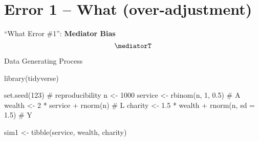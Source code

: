 \documentclass[
  ignorenonframetext,
  aspectratio=169,
  xcolor=\{dvipsnames\}]{beamer}
\newenvironment{Shaded}{\begin{snugshade}}{\end{snugshade}}
\newcommand{\AttributeTok}[1]{\textcolor[rgb]{0.40,0.45,0.13}{#1}}
\newcommand{\CommentTok}[1]{\textcolor[rgb]{0.37,0.37,0.37}{#1}}
\newcommand{\DecValTok}[1]{\textcolor[rgb]{0.68,0.00,0.00}{#1}}
\newcommand{\FloatTok}[1]{\textcolor[rgb]{0.68,0.00,0.00}{#1}}
\newcommand{\FunctionTok}[1]{\textcolor[rgb]{0.28,0.35,0.67}{#1}}
\newcommand{\NormalTok}[1]{\textcolor[rgb]{0.00,0.23,0.31}{#1}}
\newcommand{\OtherTok}[1]{\textcolor[rgb]{0.00,0.23,0.31}{#1}}
\newcommand{\SpecialCharTok}[1]{\textcolor[rgb]{0.37,0.37,0.37}{#1}}
\begin{document}
\section{Error 1 -- What
(over-adjustment)}\label{error-1-what-over-adjustment}

\begin{frame}{``What Error \#1'': \textbf{Mediator Bias}}
\label{what-error-1-mediator-bias}
\[\mediatorT\]
\end{frame}

\begin{frame}[fragile]{Data Generating Process}
\label{data-generating-process}
\begin{Shaded}
\begin{Highlighting}[]
\FunctionTok{library}\NormalTok{(tidyverse)}

\FunctionTok{set.seed}\NormalTok{(}\DecValTok{123}\NormalTok{)                           }\CommentTok{\# reproducibility}
\NormalTok{n        }\OtherTok{\textless{}{-}} \DecValTok{1000}
\NormalTok{service  }\OtherTok{\textless{}{-}} \FunctionTok{rbinom}\NormalTok{(n, }\DecValTok{1}\NormalTok{, }\FloatTok{0.5}\NormalTok{)          }\CommentTok{\# A}
\NormalTok{wealth   }\OtherTok{\textless{}{-}} \DecValTok{2} \SpecialCharTok{*}\NormalTok{ service }\SpecialCharTok{+} \FunctionTok{rnorm}\NormalTok{(n)     }\CommentTok{\# L}
\NormalTok{charity  }\OtherTok{\textless{}{-}} \FloatTok{1.5} \SpecialCharTok{*}\NormalTok{ wealth }\SpecialCharTok{+} \FunctionTok{rnorm}\NormalTok{(n, }\AttributeTok{sd =} \FloatTok{1.5}\NormalTok{)  }\CommentTok{\# Y}

\NormalTok{sim1 }\OtherTok{\textless{}{-}} \FunctionTok{tibble}\NormalTok{(service, wealth, charity)}
\end{Highlighting}
\end{Shaded}
\end{frame}
\end{document}
